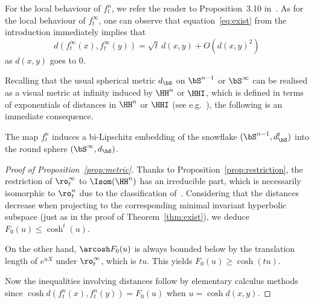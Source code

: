 For the local behaviour of $f^n_t$, we refer the reader to Proposition~3.10 in~\cite{Monod-Py}. As for the local behaviour of $f^\infty_t$, one can observe that equation~\eqref{eq:exist} from the introduction immediately implies that
\begin{equation*}
d(f^\infty_t(x),f^\infty_t(y))=\sqrt{t}\,d(x,y)+O\left(d(x,y)^2\right)
\end{equation*}
as $d(x,y)$ goes to $0$.

Recalling that the usual spherical metric $d_{\bS}$ on $\bS^{n-1}$ or $\bS^\infty$ can be realised as a visual metric at infinity induced by $\HH^n$ or $\HHI$, which is defined in terms of exponentials of distances in $\HH^n$ or $\HHI$ (see e.g.~\cite[p.~434]{Bridson-Haefliger}), the following is an immediate consequence.

\begin{coro}
The map $f^n_t$ induces a bi-Lipschitz embedding of the snow\-flake $(\bS^{n-1}, d_{\bS}^t)$ into the round sphere $(\bS^\infty, d_{\bS})$.
\end{coro}

\begin{proof}[Proof of Proposition~\ref{prop:metric}]
Thanks to Proposition~\ref{prop:restriction}, the restriction of $\ro^\infty_t$ to $\Isom(\HH^n)$ has an irreducible part, which is necessarily isomorphic to $\ro^n_t$ due to the classification of~\cite{Monod-Py}. Considering that the distances decrease when projecting to the corresponding minimal invariant hyperbolic subspace (just as in the proof of Theorem~\ref{thm:exist}), we deduce $F_0(u) \leq \cosh^t(u)$.

On the other hand, $\arcosh F_0(u)$ is always bounded below by the translation length of $e^{u X}$ under $\ro^\infty_t$, which is $t u$. This yields $F_0(u) \geq \cosh(t u)$.

Now the inequalities involving distances follow by elementary calculus methods since $\cosh d\left(f^n_t(x), f^n_t(y)\right) =F_0(u)$ when $u=\cosh d(x,y)$.
\end{proof}



